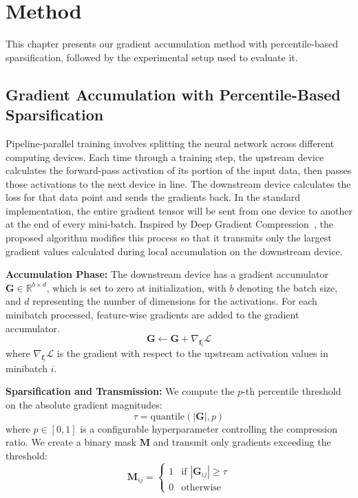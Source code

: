 \chapter{Method}

This chapter presents our gradient accumulation method with percentile-based sparsification, followed by the experimental setup used to evaluate it.

\section{Gradient Accumulation with Percentile-Based Sparsification}

Pipeline-parallel training involves splitting the neural network across different computing devices. Each time through a training step, the upstream device calculates the forward-pass activation of its portion of the input data, then passes those activations to the next device in line. The downstream device calculates the loss for that data point and sends the gradients back. In the standard implementation, the entire gradient tensor will be sent from one device to another at the end of every mini-batch. Inspired by Deep Gradient Compression~\cite{dgc2018}, the proposed algorithm modifies this process so that it transmits only the largest gradient values calculated during local accumulation on the downstream device.

\textbf{Accumulation Phase:} The downstream device has a gradient accumulator $\mathbf{G} \in \mathbb{R}^{b\times d}$, which is set to zero at initialization, with $b$ denoting the batch size, and $d$ representing the number of dimensions for the activations. For each minibatch processed, feature-wise gradients are added to the gradient accumulator.
\begin{equation}
\mathbf{G} \leftarrow \mathbf{G} + \nabla_{\mathbf{f}_i} \mathcal{L}
\end{equation}
where $\nabla_{\mathbf{f}_i} \mathcal{L}$ is the gradient with respect to the upstream activation values in minibatch $i$.

\textbf{Sparsification and Transmission:} We compute the $p$-th percentile threshold on the absolute gradient magnitudes:
\begin{equation}
\tau = \text{quantile}(|\mathbf{G}|, p)
\end{equation}
where $p \in [0, 1]$ is a configurable hyperparameter controlling the compression ratio. We create a binary mask $\mathbf{M}$ and transmit only gradients exceeding the threshold:
\begin{equation}
\mathbf{M}_{ij} = \begin{cases}
1 & \text{if } |\mathbf{G}_{ij}| \geq \tau \\
0 & \text{otherwise}
\end{cases}
\end{equation}

